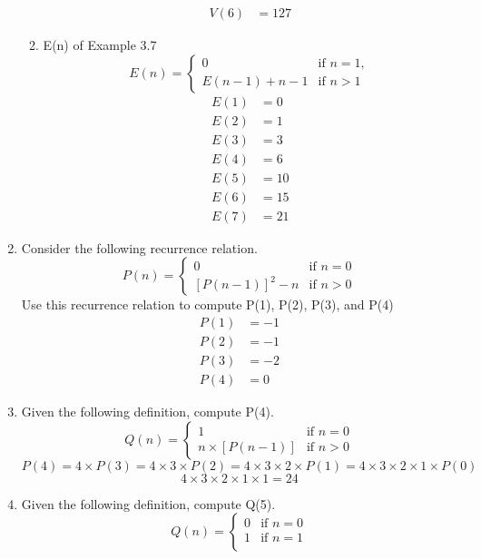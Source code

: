 \documentclass[12pt]{article}
\begin{document}
\begin{enumerate}
\begin{enumerate}
\begin{align*}
            V(6) &= 127
        \end{align*}
        \item E(n) of Example 3.7
        \[
        E(n) = 
        \begin{cases} 
        0 &     \text{if } n = 1, \\
        E(n-1) + n - 1 & \text{if } n > 1 
        \end{cases}
        \]
        \begin{align*}
            E(1) &= 0\\
            E(2) &= 1\\
            E(3) &= 3\\
            E(4) &= 6\\
            E(5) &= 10\\
            E(6) &= 15\\
            E(7) &= 21
        \end{align*}
    \end{enumerate}
    \item Consider the following recurrence relation.
    \[
    P(n) = 
    \begin{cases} 
    0 &     \text{if } n = 0 \\
    [P(n-1)]^2 - n  & \text{if } n > 0 
    \end{cases}
    \]
    Use this recurrence relation to compute P(1), P(2), P(3), and P(4)
    \begin{align*}
        P(1) &= -1\\
        P(2) &= -1\\
        P(3) &= -2\\
        P(4) &= 0
    \end{align*}
    \item Given the following definition, compute P(4).
    \[
    Q(n) = 
    \begin{cases} 
    1 &     \text{if } n = 0 \\
    n\times [P(n - 1)] & \text{if } n > 0
    \end{cases}
    \]
    \[P(4) = 4 \times P(3) = 4 \times 3 \times P(2) = 4 \times 3 \times 2 \times P(1) = 4 \times 3 \times 2 \times 1 \times P(0)\]
    \[4 \times 3 \times 2 \times 1 \times 1 = 24\]
    \item Given the following definition, compute Q(5).
    \[
    Q(n) = 
    \begin{cases} 
    0 &     \text{if } n = 0 \\
    1 & \text{if } n = 1\\

\end{cases}\]
\end{enumerate}
\end{document}
